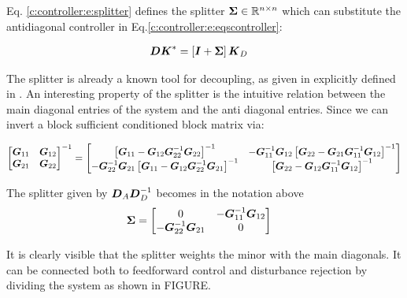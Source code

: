 Eq. \ref{c:controller:e:splitter} defines the splitter $\mbox{\boldmath$\Sigma$} \in \mathbb{R}^{n \times n}$ which can substitute the antidiagonal controller in Eq.\ref{c:controller:e:eqscontroller}:

\begin{align}
\begin{split}
\mbox{\boldmath$D$} \mbox{\boldmath$K$}^* &= \left[ \mbox{\boldmath$I$} + \mbox{\boldmath$\Sigma$} \right] \mbox{\boldmath$K$}_D
\end{split}
\label{c:controller:e:controleqs}
\end{align}

The splitter is already a known tool for decoupling, as given in \cite[p.190 ff.]{Wang2006} explicitly defined in \cite[p.193 Eq.(6.19)]{Wang2006}. An interesting property of the splitter is the intuitive relation between the main diagonal entries of the system and the anti diagonal entries. Since we can invert a block sufficient conditioned block matrix via:

\begin{align}
\begin{split}
\begin{bmatrix}
\mbox{\boldmath$G$}_{11} & \mbox{\boldmath$G$}_{12} \\
\mbox{\boldmath$G$}_{21} & \mbox{\boldmath$G$}_{22} 
\end{bmatrix}^{-1} &= \begin{bmatrix}
\left[\mbox{\boldmath$G$}_{11} - \mbox{\boldmath$G$}_{12}\mbox{\boldmath$G$}_{22}^{-1}\mbox{\boldmath$G$}_{22}\right]^{-1} & -\mbox{\boldmath$G$}_{11}^{-1}\mbox{\boldmath$G$}_{12}\left[\mbox{\boldmath$G$}_{22} - \mbox{\boldmath$G$}_{21}\mbox{\boldmath$G$}_{11}^{-1}\mbox{\boldmath$G$}_{12}\right]^{-1}  \\
-\mbox{\boldmath$G$}_{22}^{-1}\mbox{\boldmath$G$}_{21}\left[\mbox{\boldmath$G$}_{11} - \mbox{\boldmath$G$}_{12}\mbox{\boldmath$G$}_{22}^{-1}\mbox{\boldmath$G$}_{21}\right]^{-1}  & \left[\mbox{\boldmath$G$}_{22} - \mbox{\boldmath$G$}_{12}\mbox{\boldmath$G$}_{11}^{-1}\mbox{\boldmath$G$}_{12}\right]^{-1} 
\end{bmatrix} \\
\end{split}
\end{align}

The splitter given by $\mbox{\boldmath$D$}_A\mbox{\boldmath$D$}_D^{-1}$ becomes in the notation above
\begin{align}
\begin{split}
\mbox{\boldmath$\Sigma$} &= \begin{bmatrix}
0 & -\mbox{\boldmath$G$}_{11}^{-1}\mbox{\boldmath$G$}_{12}\\
-\mbox{\boldmath$G$}_{22}^{-1}\mbox{\boldmath$G$}_{21}  & 0
\end{bmatrix}
\end{split}
\end{align}

It is clearly visible that the splitter weights the minor with the main diagonals. It can be connected both to feedforward control and disturbance rejection by dividing the system as shown in FIGURE.\\

